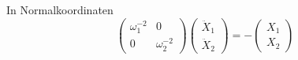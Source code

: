 \documentclass[12pt,compress]{beamer}
\begin{document}
{{    \vfill

    In Normalkoordinaten
    \begin{equation}
    \begin{pmatrix}
    \omega_1^{-2} & 0 \\
    0 & \omega_2^{-2}
    \end{pmatrix}
    \begin{pmatrix}
    \ddot X_1 \\ \ddot X_2
    \end{pmatrix} =
    -\begin{pmatrix}
    X_1 \\ X_2
    \end{pmatrix}
    \end{equation}
    }
}

\end{document}
